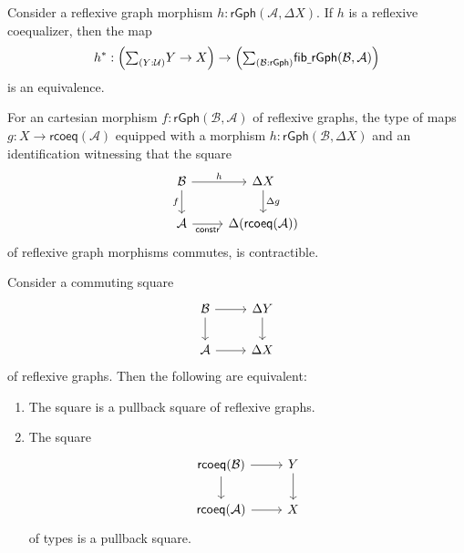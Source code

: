 \begin{thm}\label{thm:descent_rcoeq}
Consider a reflexive graph morphism $h:\mathsf{rGph}(\mathcal{A},\Delta X)$. If $h$ is a reflexive coequalizer, then the map
\begin{equation*}
h^\ast : \Big(\sm{Y:\UU}Y\to X\Big)\to \Big(\sm{\mathcal{B}:\mathsf{rGph}}\mathsf{fib\usc{}rGph}(\mathcal{B},\mathcal{A})\Big)
\end{equation*}
is an equivalence. 
\end{thm}

\begin{cor}\label{cor:descent_rcoeq}
For an cartesian morphism $f:\mathsf{rGph}(\mathcal{B},\mathcal{A})$ of reflexive graphs, the type of maps $g:X\to \mathsf{rcoeq}(\mathcal{A})$ equipped with a morphism $h:\mathsf{rGph}(\mathcal{B},\Delta X)$ and an identification witnessing that the square
\begin{equation*}
\begin{tikzcd}
\mathcal{B} \arrow[d,swap,"f"] \arrow[r,"h"] & \Delta X \arrow[d,"\Delta g"] \\
\mathcal{A} \arrow[r,swap,"\mathsf{constr}"] & \Delta(\mathsf{rcoeq}(\mathcal{A}))
\end{tikzcd}
\end{equation*}
of reflexive graph morphisms commutes, is contractible.
\end{cor}

\begin{thm}\label{thm:rcoeq_cartesian}
Consider a commuting square
\begin{equation*}
\begin{tikzcd}
\mathcal{B} \arrow[r] \arrow[d] & \Delta Y \arrow[d] \\
\mathcal{A} \arrow[r] & \Delta X 
\end{tikzcd}
\end{equation*}
of reflexive graphs. Then the following are equivalent:
\begin{enumerate}
\item The square is a pullback square of reflexive graphs.
\item The square
\begin{equation*}
\begin{tikzcd}
\mathsf{rcoeq}(\mathcal{B}) \arrow[r] \arrow[d] & Y \arrow[d] \\
\mathsf{rcoeq}(\mathcal{A}) \arrow[r] & X 
\end{tikzcd}
\end{equation*}
of types is a pullback square.
\end{enumerate}
\end{thm}

